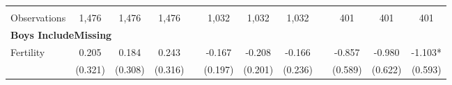 \begin{landscape}
\begin{table}[htpb!]
\begin{center}
\begin{tabular}{lcccp{2mm}cccp{2mm}ccc}
\begin{footnotesize}\end{footnotesize}&\begin{footnotesize}\end{footnotesize}&\begin{footnotesize}\end{footnotesize}&\begin{footnotesize}\end{footnotesize}&\begin{footnotesize}\end{footnotesize}&\begin{footnotesize}\end{footnotesize}&\begin{footnotesize}\end{footnotesize}&\begin{footnotesize}\end{footnotesize}&\begin{footnotesize}\end{footnotesize}&\begin{footnotesize}\end{footnotesize}&\begin{footnotesize}\end{footnotesize}&\begin{footnotesize}\end{footnotesize}\\Observations&1,476&1,476&1,476&&1,032&1,032&1,032&&401&401&401\\
\multicolumn{12}{l}{\textbf{Boys IncludeMissing}}\\ 
Fertility&0.205&0.184&0.243&&-0.167&-0.208&-0.166&&-0.857&-0.980&-1.103*\\
&(0.321)&(0.308)&(0.316)&&(0.197)&(0.201)&(0.236)&&(0.589)&(0.622)&(0.593)\\

\end{tabular}
\end{center}
\end{table}
\end{landscape}
